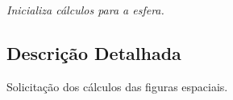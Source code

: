 \begin{DoxyCompactItemize}
\begin{DoxyCompactList}\small\item\em Inicializa cálculos para a esfera. \end{DoxyCompactList}\end{DoxyCompactItemize}


\subsection{Descrição Detalhada}
Solicitação dos cálculos das figuras espaciais. 

